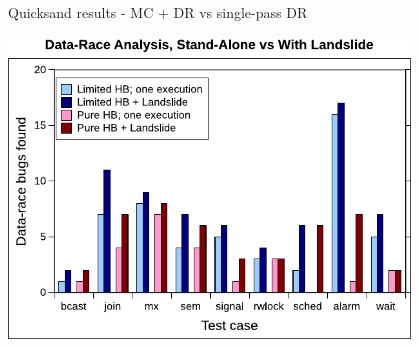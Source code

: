 \documentclass[xcolor=dvipsnames]{beamer}
\begin{document}
\begin{frame}{Quicksand results - MC + DR vs single-pass DR}
	\begin{center}
		\includegraphics[width=0.8\textwidth]{../../oopsla/dr-false-negatives-poster.pdf}
	\end{center}
\end{frame}
\end{document}
